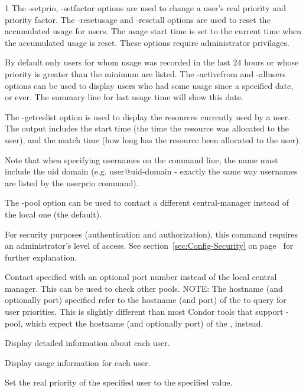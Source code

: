 \begin{ManPage}{\label{man-condor-userprio}}{1}
The -setprio, -setfactor options are used to change a user's real priority and priority factor.
The -resetusage and -resetall options are used to reset the accumulated usage for users. The
usage start time is set to the current time when the accumulated usage is reset. These
options require administrator privilages.

By default only users for whom usage was recorded in the last 24 hours or whose priority is
greater than the minimum are listed. The -activefrom and -allusers options can be used
to display users who had some usage since a specified date, or ever. The summary line for 
last usage time will show this date.

The -getreslist option is used to display the resources currently used by a user. The
output includes the start time (the time the resource was allocated to the user), and
the match time (how long has the resource been allocated to the user).

Note that when specifying usernames on the command line, the name must include the
uid domain (e.g. user@uid-domain - exactly the same way usernames are listed by the
userprio command).

The -pool option can be used to contact a different central-manager instead of
the local one (the default).

For security purposes (authentication and authorization),
this command requires an administrator's level of access.
See
section~\ref{sec:Config-Security} on page~\pageref{sec:Config-Security}
for further explanation.

\begin{Options}

	{Contact specified  with an
	optional port number instead of the local central
	manager. This can be used to check other pools.  NOTE: The
	hostname (and optionally port) specified refer to the hostname
	(and port) of the  to query for user
	priorities.  This is slightly different than most Condor tools
	that support -pool, which expect the hostname (and optionally
	port) of the , instead.}

	{Display detailed information about each user.}

	{Display usage information for each user.}

	{Set the real priority of the specified user to the specified value.}


\end{Options}
\end{ManPage}
